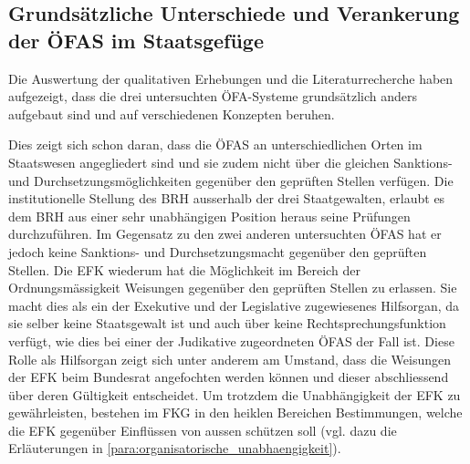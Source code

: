 \documentclass[10pt]{article}
\begin{document}
\subsection{Grundsätzliche Unterschiede und Verankerung der ÖFAS im Staatsgefüge}\label{subsec:grundsaetzliche_unterschiede_und_verankerung_der_ofas_im_staatsgefuege}
Die Auswertung der qualitativen Erhebungen und die Literaturrecherche haben aufgezeigt, dass die drei untersuchten ÖFA-Systeme grundsätzlich anders aufgebaut sind und auf verschiedenen Konzepten beruhen.

Dies zeigt sich schon daran, dass die ÖFAS an unterschiedlichen Orten im Staatswesen angegliedert sind und sie zudem nicht über die gleichen Sanktions- und Durchsetzungs­möglichkeiten gegenüber den geprüften Stellen verfügen. Die institutionelle Stellung des BRH ausserhalb der drei Staatgewalten, erlaubt es dem BRH aus einer sehr unabhängigen Position heraus seine Prüfungen durchzuführen. Im Gegensatz zu den zwei anderen untersuchten ÖFAS hat er jedoch keine Sanktions- und Durchsetzungsmacht gegenüber den geprüften Stellen. Die EFK wiederum hat die Möglichkeit im Bereich der Ordnungsmässigkeit Weisungen gegenüber den geprüften Stellen zu erlassen. Sie macht dies als ein der Exekutive und der Legislative zugewiesenes Hilfsorgan, da sie selber keine Staatsgewalt ist und auch über keine Rechtsprechungsfunktion verfügt, wie dies bei einer der Judikative zugeordneten ÖFAS der Fall ist. Diese Rolle als Hilfsorgan zeigt sich unter anderem am Umstand, dass die Weisungen der EFK beim Bundesrat angefochten werden können und dieser abschliessend über deren Gültigkeit entscheidet. Um trotzdem die Unabhängigkeit der EFK zu gewährleisten, bestehen im FKG in den heiklen Bereichen Bestimmungen, welche die EFK gegenüber Einflüssen von aussen schützen soll (vgl. dazu die Erläuterungen in \vref{para:organisatorische_unabhaengigkeit}).
\end{document}
